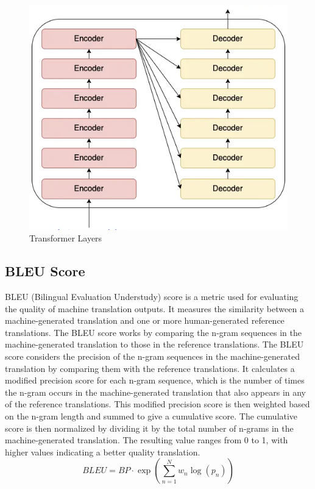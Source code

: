 \documentclass[12pt]{report}
\begin{document}
\begin{figure}[h!]
    \centering
    \includegraphics[scale = 0.6]{Images/Tfer_Layers.png}
    \caption{Transformer Layers}
    \label{fig:Transformer Layers}
\end{figure}
\subsection{BLEU Score}
BLEU (Bilingual Evaluation Understudy) score is a metric used for evaluating the quality of machine translation outputs. It measures the similarity between a machine-generated translation and one or more human-generated reference translations. The BLEU score works by comparing the n-gram sequences in the machine-generated translation to those in the reference translations. The BLEU score considers the precision of the n-gram sequences in the machine-generated translation by comparing them with the reference translations. It calculates a modified precision score for each n-gram sequence, which is the number of times the n-gram occurs in the machine-generated translation that also appears in any of the reference translations. This modified precision score is then weighted based on the n-gram length and summed to give a cumulative score. The cumulative score is then normalized by dividing it by the total number of n-grams in the machine-generated translation. The resulting value ranges from 0 to 1, with higher values indicating a better quality translation.
\begin{equation}
    BLEU = BP \cdot \exp\left(\sum_{n=1}^N w_n \log(p_n)\right)
\end{equation}
\end{document}
